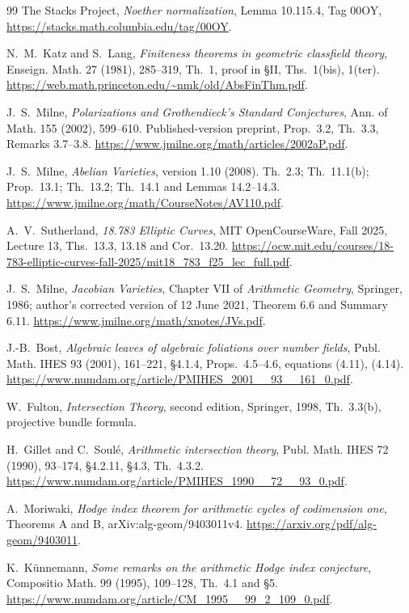 \begin{thebibliography}{99}
The Stacks Project, \emph{Noether normalization}, Lemma 10.115.4,
Tag 00OY, \url{https://stacks.math.columbia.edu/tag/00OY}.

N.~M.~Katz and S.~Lang, \emph{Finiteness theorems in geometric classfield
theory}, Enseign. Math. 27 (1981), 285--319, Th.~1, proof in \S II,
Ths.~1(bis), 1(ter).
\url{https://web.math.princeton.edu/~nmk/old/AbsFinThm.pdf}.

J.~S.~Milne, \emph{Polarizations and Grothendieck's Standard Conjectures},
Ann. of Math. 155 (2002), 599--610. Published-version preprint,
Prop.~3.2, Th.~3.3, Remarks 3.7--3.8.
\url{https://www.jmilne.org/math/articles/2002aP.pdf}.

J.~S.~Milne, \emph{Abelian Varieties}, version 1.10 (2008).
Th.~2.3; Th.~11.1(b); Prop.~13.1; Th.~13.2; Th.~14.1 and
Lemmas 14.2--14.3.
\url{https://www.jmilne.org/math/CourseNotes/AV110.pdf}.

A.~V.~Sutherland, \emph{18.783 Elliptic Curves}, MIT OpenCourseWare,
Fall 2025, Lecture 13, Ths.~13.3, 13.18 and Cor.~13.20.
\url{https://ocw.mit.edu/courses/18-783-elliptic-curves-fall-2025/mit18_783_f25_lec_full.pdf}.

J.~S.~Milne, \emph{Jacobian Varieties}, Chapter VII of
\emph{Arithmetic Geometry}, Springer, 1986; author's corrected version
of 12 June 2021, Theorem 6.6 and Summary 6.11. \url{https://www.jmilne.org/math/xnotes/JVs.pdf}.

J.-B.~Bost, \emph{Algebraic leaves of algebraic foliations over number
fields}, Publ. Math. IHES 93 (2001), 161--221,
\S4.1.4, Props.~4.5--4.6, equations (4.11), (4.14).
\url{https://www.numdam.org/article/PMIHES_2001__93__161_0.pdf}.

W.~Fulton, \emph{Intersection Theory}, second edition, Springer, 1998,
Th.~3.3(b), projective bundle formula.

H.~Gillet and C.~Soul\'e, \emph{Arithmetic intersection theory},
Publ. Math. IHES 72 (1990), 93--174, \S4.2.11, \S4.3,
Th.~4.3.2.
\url{https://www.numdam.org/article/PMIHES_1990__72__93_0.pdf}.

A.~Moriwaki, \emph{Hodge index theorem for arithmetic cycles of
codimension one}, Theorems A and B, arXiv:alg-geom/9403011v4.
\url{https://arxiv.org/pdf/alg-geom/9403011}.

K.~K\"unnemann, \emph{Some remarks on the arithmetic Hodge index
conjecture}, Compositio Math. 99 (1995), 109--128,
Th.~4.1 and \S5.
\url{https://www.numdam.org/article/CM_1995__99_2_109_0.pdf}.


\end{thebibliography}
